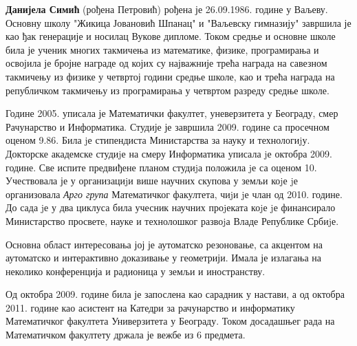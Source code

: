 \documentclass[a4paper,12pt,oneside]{memoir}
\begin{document}
\begin{biografija}
  \textbf{Данијела Симић} (рођена Петровић) рођена је
  26.09.1986. године у Ваљеву. Основну школу "Жикица Јовановић Шпанац"
  и "Ваљевску гимназију" завршила је као ђак генерације и носилац
  Вукове дипломе.  Током средње и основне школе била је ученик многих
  такмичења из математике, физике, програмирања и освојила је бројне
  награде од којих су најважније трећа награда на савезном такмичењу
  из физике у четвртој години средње школе, као и трећа награда на
  републичком такмичењу из програмирања у четвртом разреду средње
  школе.

  Године 2005. уписала је Математички факултет, уневерзитета у
  Београду, смер Рачунарство и Информатика. Студије је завршила
  2009. године са просечном оценом 9.86. Била jе стипендиста
  Министарства за науку и технологиjу. Докторске академске студиjе на
  смеру Информатика уписала jе октобра 2009. године. Све испите
  предвиђене планом студиjа положила jе са оценом 10. Учествовала је у
  организациjи више научних скупова у земљи коjе jе организовала
  \emph{Арго група} Математичког факултета, чиjи jе члан од
  2010. године. До сада jе у два циклуса била учесник научних
  проjеката коjе jе финансирало Министарство просвете, науке и
  технолошког развоjа Владе Републике Србиjе.

  Основна област интересовања јој је аутоматско резоновање, са
  акцентом на аутоматско и интерактивно доказивање у геометрији. Имала
  је излагања на неколико конференција и радионица у земљи и
  иностранству.

  Од октобра 2009. године била је запослена као сарадник у настави, а
  од октобра 2011. године као асистент на Катедри за рачунарство и
  информатику Математичког факултета Универзитета у Београду. Током
  досадашњег рада на Математичком факултету држала је вежбе из 6
  предмета.
\end{biografija}





\end{document}

